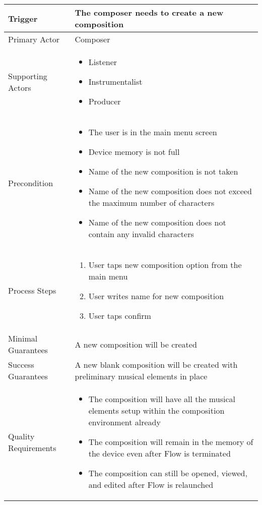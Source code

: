 \begin{longtable}{|X|X|}

\hline
Trigger & 
The composer needs to create a new composition \\
\hline
Primary Actor & 
Composer \\
\hline
Supporting Actors & 
\begin{itemize}
\item Listener
\item Instrumentalist
\item Producer
\end{itemize} \\
\hline
Precondition & 
\begin{itemize}
\item The user is in the main menu screen
\item Device memory is not full
\item Name of the new composition is not taken
\item Name of the new composition does not exceed the maximum number of characters
\item Name of the new composition does not contain any invalid characters
\end{itemize} \\
\hline
Process Steps & 
\begin{enumerate}
\item User taps new composition option from the main menu
\item User writes name for new composition
\item User taps confirm
\end{enumerate} \\
\hline
Minimal Guarantees & 
A new composition will be created \\
\hline
Success Guarantees & 
A new blank composition will be created with preliminary musical elements in place \\
\hline
Quality Requirements &
\begin{itemize}
\item The composition will have all the musical elements setup within the composition environment already
\item The composition will remain in the memory of the device even after Flow is terminated
\item The composition can still be opened, viewed, and edited after Flow is relaunched
\end{itemize} \\ 
\hline

\end{longtable}